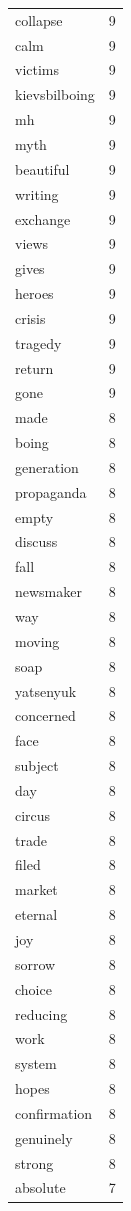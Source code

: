 \begin{tabular}{lr}
collapse & 9 \\
calm & 9 \\
victims & 9 \\
kievsbilboing & 9 \\
mh & 9 \\
myth & 9 \\
beautiful & 9 \\
writing & 9 \\
exchange & 9 \\
views & 9 \\
gives & 9 \\
heroes & 9 \\
crisis & 9 \\
tragedy & 9 \\
return & 9 \\
gone & 9 \\
made & 8 \\
boing & 8 \\
generation & 8 \\
propaganda & 8 \\
empty & 8 \\
discuss & 8 \\
fall & 8 \\
newsmaker & 8 \\
way & 8 \\
moving & 8 \\
soap & 8 \\
yatsenyuk & 8 \\
concerned & 8 \\
face & 8 \\
subject & 8 \\
day & 8 \\
circus & 8 \\
trade & 8 \\
filed & 8 \\
market & 8 \\
eternal & 8 \\
joy & 8 \\
sorrow & 8 \\
choice & 8 \\
reducing & 8 \\
work & 8 \\
system & 8 \\
hopes & 8 \\
confirmation & 8 \\
genuinely & 8 \\
strong & 8 \\
absolute & 7 \\

\end{tabular}
